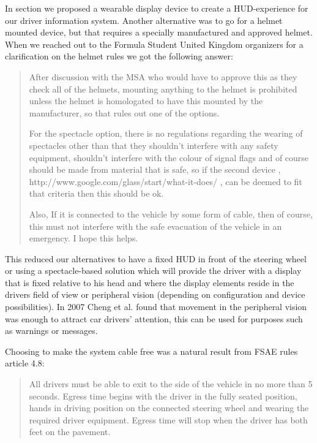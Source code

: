 In section we proposed a wearable display device to
create a HUD-experience for our driver information system. Another alternative
was to go for a helmet mounted device, but that requires a specially
manufactured and approved helmet. When we reached out to the Formula Student
United Kingdom organizers for a clarification on the helmet rules we got the
following answer:
\begin{quote}
After discussion with the MSA who would have to approve this as they check all of the helmets, mounting anything to the helmet is prohibited unless the helmet is homologated to have this mounted by the manufacturer, so that rules out one of the options.

For the spectacle option, there is no regulations regarding the wearing of spectacles  other than that they shouldn’t interfere with any safety equipment, shouldn’t interfere with the colour of signal flags and of course should be made from material that is safe, so if the second device , http://www.google.com/glass/start/what-it-does/ , can be deemed to fit that criteria then this should be ok.
 
Also, If it is connected to the vehicle by some form of cable, then of course, this must not interfere with the safe evacuation of the vehicle in an emergency.
I hope this helps.
\end{quote}

This reduced our alternatives to have a fixed HUD in front of the steering
wheel or using a spectacle-based solution which will provide the driver with a
display that is fixed relative to his head and where the display elements
reside in the drivers field of view or peripheral vision (depending on
configuration and device possibilities). In 2007 Cheng et al. \cite{cheng2007intelligentVehicles} found that movement in the peripheral vision was enough to
attract car drivers' attention, this can be used for purposes such as warnings or messages. 

Choosing to make the system cable free was a natural result from FSAE rules
article 4.8:
	\begin{quote}
		All drivers must be able to exit to the side of the vehicle in no more than 5 seconds. Egress time 
		begins with the driver in the fully seated position, hands in driving position on the connected steering 
		wheel and wearing the required driver equipment. Egress time will stop when the driver has both feet 
		on the pavement. \cite{fsae:2014rules}
	\end{quote}

